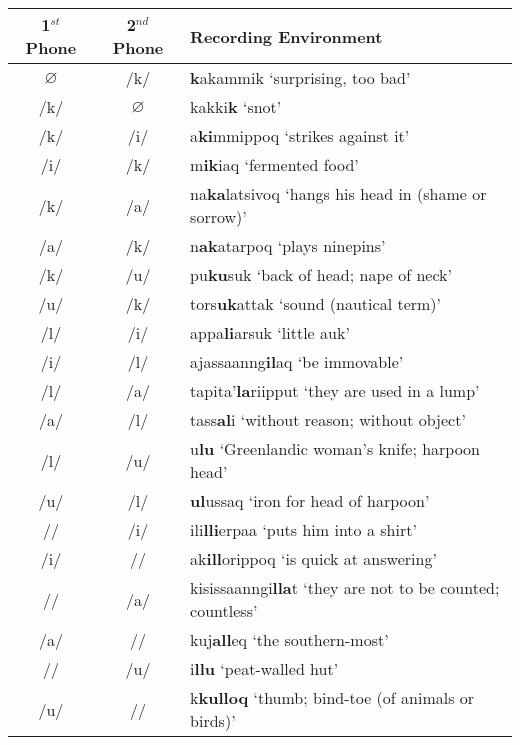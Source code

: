 \documentclass[12pt]{article}
\begin{document}
	\begin{tabular}{|c|c|l|}
	\hline
	1$^{st}$ Phone & 2$^{nd}$ Phone & Recording Environment \\
	\hline
	$\varnothing$ & /k/ & \textbf{k}akammik `surprising, too bad'\\
	/k/ & $\varnothing$ & kakki\textbf{k} `snot'\\
	/k/ & /i/ & a\textbf{ki}mmippoq `strikes against it' \\
	/i/ & /k/ & m\textbf{ik}iaq `fermented food' \\
	/k/ & /a/ & na\textbf{ka}latsivoq `hangs his head in (shame or sorrow)'\\
	/a/ & /k/ & n\textbf{ak}atarpoq `plays ninepins' \\
	/k/ & /u/ & pu\textbf{ku}suk `back of head; nape of neck' \\
	/u/ & /k/ & tors\textbf{uk}attak `sound (nautical term)' \\
	/l/ & /i/ & appa\textbf{li}arsuk `little auk'\\
	/i/ & /l/ & ajassaanng\textbf{il}aq `be immovable'\\
	/l/ & /a/ & tapita'\textbf{la}riipput `they are used in a lump'\\
	/a/ & /l/ & tass\textbf{al}i `without reason; without object'\\
	/l/ & /u/ & u\textbf{lu} `Greenlandic woman's knife; harpoon head'\\
	/u/ & /l/ & \textbf{ul}ussaq `iron for head of harpoon'\\
	/\textbeltl/ & /i/ & ili\textbf{lli}erpaa `puts him into a shirt'\\
	/i/ & /\textbeltl/ & ak\textbf{ill}orippoq `is quick at answering'\\
	/\textbeltl/ & /a/ & kisissaanngi\textbf{lla}t `they are not to be counted; countless'\\
	/a/ & /\textbeltl/ & kuj\textbf{all}eq `the southern-most'\\
	/\textbeltl/ & /u/ & i\textbf{llu} `peat-walled hut' \\
	/u/ & /\textbeltl/ & k\textbf{kulloq} `thumb; bind-toe (of animals or birds)' \\
	\hline
	\end{tabular}
	\newpage
\end{document}
